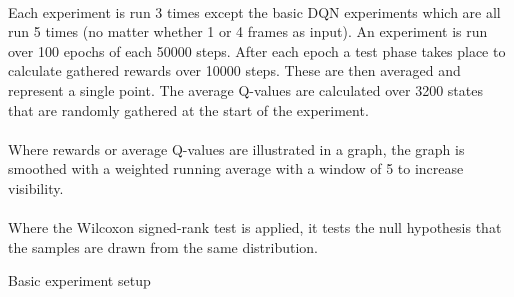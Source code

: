 \begin{table}[]
  \paragraph{}
  Each experiment is run 3 times
  except the basic DQN experiments which are all run 5 times
  (no matter whether 1 or 4 frames as input).
  An experiment is run over 100 epochs of each 50000 steps.
  After each epoch a test phase takes place to calculate gathered rewards
  over 10000 steps.
  These are then averaged and represent a single point.
  The average Q-values are calculated over 3200 states
  that are randomly gathered at the start of the experiment.

  \paragraph{}
  Where rewards or average Q-values are illustrated in a graph,
  the graph is smoothed with a weighted running average
  with a window of 5
  to increase visibility.

  \paragraph{}
  Where the Wilcoxon signed-rank test is applied,
  it tests the null hypothesis that the samples
  are drawn from the same distribution.

  \caption{Basic experiment setup}
  \label{fig:basic_setup}
\end{table}

